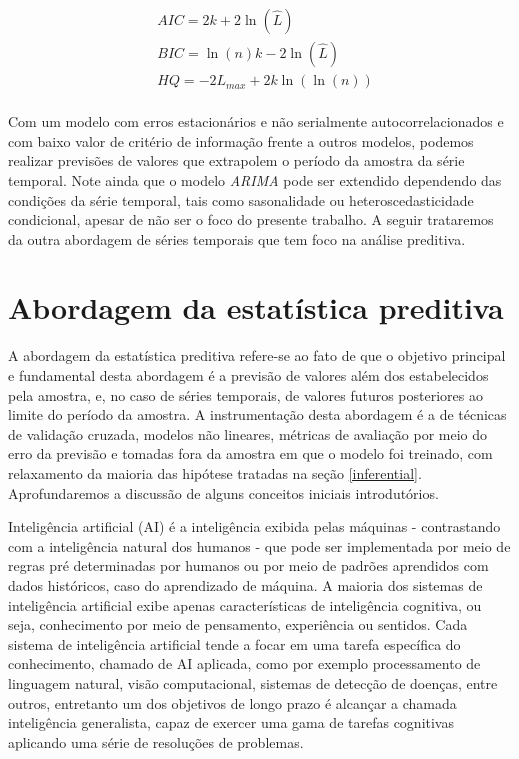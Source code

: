 \documentclass[twocolumn]{rbef}
\newcommand{\1}{\mathbbm{1}}
\begin{document}
\begin{equation}
    \begin{split}
        & AIC = 2k + 2 \ln (\hat{L}) \\
        & BIC = \ln (n) k - 2 \ln (\hat{L}) \\
        & HQ = -2 L_{max} + 2k \ln (\ln (n)) \\
    \end{split}
\end{equation}

Com um modelo com erros estacionários e não serialmente autocorrelacionados e com baixo valor de critério de informação frente a outros modelos, podemos realizar previsões \cite{Hamilton} de valores que extrapolem o período da amostra da série temporal. Note ainda que o modelo \textit{ARIMA} pode ser extendido dependendo das condições da série temporal, tais como sasonalidade ou heteroscedasticidade condicional\cite{Brockwell}, apesar de não ser o foco do presente trabalho. A seguir trataremos da outra abordagem de séries temporais que tem foco na análise preditiva.

\section{Abordagem da estatística preditiva} \label{predictive}

A abordagem da estatística preditiva refere-se ao fato de que o objetivo principal e fundamental desta abordagem é a previsão de valores além dos estabelecidos pela amostra, e, no caso de séries temporais, de valores futuros posteriores ao limite do período da amostra. A instrumentação desta abordagem é a de técnicas de validação cruzada, modelos não lineares, métricas de avaliação por meio do erro da previsão e tomadas fora da amostra em que o modelo foi treinado, com relaxamento da maioria das hipótese tratadas na seção \ref{inferential}. Aprofundaremos a discussão de alguns conceitos iniciais introdutórios.

Inteligência artificial (AI) é a inteligência exibida pelas máquinas - contrastando com a inteligência natural dos humanos - que pode ser implementada por meio de regras pré determinadas por humanos ou por meio de padrões aprendidos com dados históricos, caso do aprendizado de máquina\cite{Oliver}. A maioria dos sistemas de inteligência artificial exibe apenas características de inteligência cognitiva, ou seja, conhecimento por meio de pensamento, experiência ou sentidos. Cada sistema de inteligência artificial tende a focar em uma tarefa específica do conhecimento, chamado de AI aplicada, como por exemplo processamento de linguagem natural, visão computacional, sistemas de detecção de doenças, entre outros, entretanto um dos objetivos de longo prazo é alcançar a chamada inteligência generalista, capaz de exercer uma gama de tarefas cognitivas aplicando uma série de resoluções de problemas\cite{Laird}.
\end{document}
